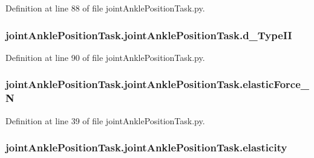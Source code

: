 Definition at line 88 of file joint\+Ankle\+Position\+Task.\+py.

\subsubsection[{\texorpdfstring{d\+\_\+\+Type\+II}{d_TypeII}}]{\setlength{\rightskip}{0pt plus 5cm}joint\+Ankle\+Position\+Task.\+joint\+Ankle\+Position\+Task.\+d\+\_\+\+Type\+II}\hypertarget{classjoint_ankle_position_task_1_1joint_ankle_position_task_aad6d252dd622cac620866575a1c30a0d}{}\label{classjoint_ankle_position_task_1_1joint_ankle_position_task_aad6d252dd622cac620866575a1c30a0d}


Definition at line 90 of file joint\+Ankle\+Position\+Task.\+py.

\subsubsection[{\texorpdfstring{elastic\+Force\+\_\+N}{elasticForce_N}}]{\setlength{\rightskip}{0pt plus 5cm}joint\+Ankle\+Position\+Task.\+joint\+Ankle\+Position\+Task.\+elastic\+Force\+\_\+N}\hypertarget{classjoint_ankle_position_task_1_1joint_ankle_position_task_adff22684de2578136d332dc7dc8cc2be}{}\label{classjoint_ankle_position_task_1_1joint_ankle_position_task_adff22684de2578136d332dc7dc8cc2be}


Definition at line 39 of file joint\+Ankle\+Position\+Task.\+py.

\subsubsection[{\texorpdfstring{elasticity}{elasticity}}]{\setlength{\rightskip}{0pt plus 5cm}joint\+Ankle\+Position\+Task.\+joint\+Ankle\+Position\+Task.\+elasticity}\hypertarget{classjoint_ankle_position_task_1_1joint_ankle_position_task_ab4a33bf81b56f4153e3056226dc800b8}{}\label{classjoint_ankle_position_task_1_1joint_ankle_position_task_ab4a33bf81b56f4153e3056226dc800b8}


